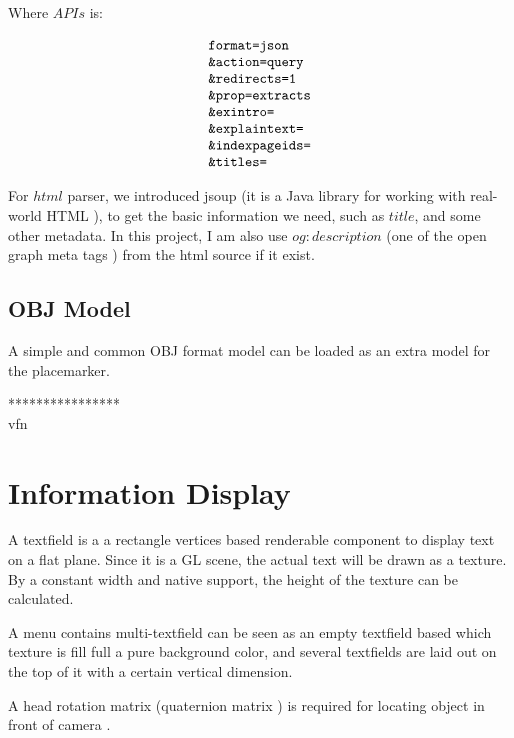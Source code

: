 Where $APIs$ is:

\[
\begin{array}{lr}
\texttt{format=json} \\
\texttt{\&action=query} \\
\texttt{\&redirects=1} \\
\texttt{\&prop=extracts} \\
\texttt{\&exintro=} \\
\texttt{\&explaintext=} \\
\texttt{\&indexpageids=} \\
\texttt{\&titles=}
\end{array}
\]

For $html$ parser, we introduced jsoup (it is a Java library for working with real-world HTML \parencite{joup.2016}), to get the basic information we need, such as $title$, and some other metadata. In this project, I am also use $og:description$ (one of the open graph meta tags \parencite{ogp.2014}) from the html source if it exist.

\subsection{OBJ Model}

A simple and common OBJ format model can be loaded as an extra model for the placemarker.

****************\\
vfn\\

\section{Information Display}

A textfield is a a rectangle vertices based renderable component to display text on a flat plane. Since it is a GL scene, the actual text will be drawn as a texture. By a constant width and native  support, the height of the texture can be calculated. 

A menu contains multi-textfield can be seen as an empty textfield based which texture is fill full a pure background color, and several  textfields are laid out on the top of it with a certain vertical dimension.

A head rotation matrix (quaternion matrix \parencite{jvv.quaternions.2013}) is required for locating object in front of camera \parencite{mathworks.quaternion-rotation.2016} .

